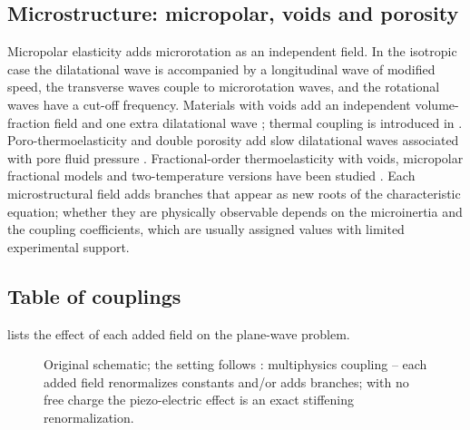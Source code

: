 \subsection{Microstructure: micropolar, voids and porosity}
Micropolar elasticity \citep{Eringen1966a,Eringen1999,TauchertClausAriman1968} adds microrotation as an independent field. In the isotropic case the dilatational wave is accompanied by a longitudinal wave of modified speed, the transverse waves couple to microrotation waves, and the rotational waves have a cut-off frequency. Materials with voids add an independent volume-fraction field \citep{Nunziato1979,Cowin1983,Iesan1986} and one extra dilatational wave \citep{Cowin1983}; thermal coupling is introduced in \citep{Iesan1986}. Poro-thermoelasticity and double porosity add slow dilatational waves associated with pore fluid pressure \citep{Singh2020,Kumar2022,Kumar2025}. Fractional-order thermoelasticity with voids, micropolar fractional models and two-temperature versions have been studied \citep{Bachher2019,Sharma2022,Biswas2020a,Kalkal2020,Kumar2008,Kumar2018}. Each microstructural field adds branches that appear as new roots of the characteristic equation; whether they are physically observable depends on the microinertia and the coupling coefficients, which are usually assigned values with limited experimental support.

\subsection{Table of couplings}
 lists the effect of each added field on the plane-wave problem.

\begin{figure}[t!]\centering\small

\caption{Original schematic; the setting follows \citep{Nowacki1978,Chandrasekharaiah1984}: multiphysics coupling -- each added field renormalizes constants and/or adds branches; with no free charge the piezo-electric effect is an exact stiffening renormalization.}\label{fig:multi-geo}
\end{figure}

